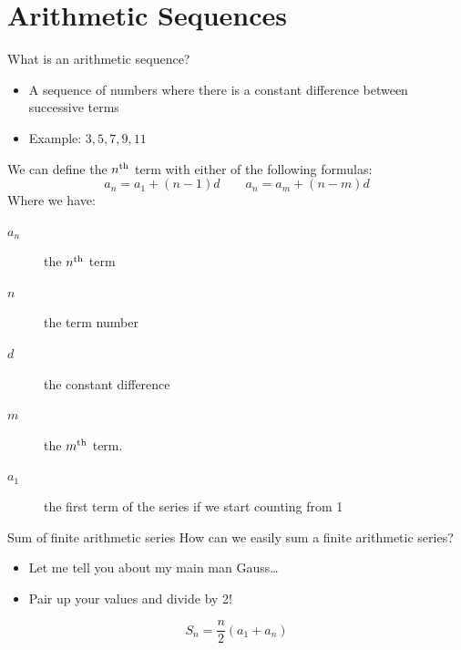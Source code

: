 	\section{Arithmetic Sequences}
	\begin{namedframe}{What is an arithmetic sequence?}
		\begin{itemize}
			\item A sequence of numbers where there is a constant difference between successive terms
			\item Example: $3,5,7,9,11$
		\end{itemize}
		\pause
		We can define the $n\textsuperscript{th}$ term with either of the following formulas:
		\[a_n = a_1 + (n-1)d \qquad a_n = a_m + (n-m)d\]
		Where we have:
		\begin{description}
			\item[$a_n$] the $n\textsuperscript{th}$ term
			\item[$n$] the term number
			\item[$d$] the constant difference
			\item[$m$] the $m\textsuperscript{th}$ term.
			\item[$a_1$] the first term of the series if we start counting from 1
		\end{description}
	\end{namedframe}
	\begin{namedframe}{Sum of finite arithmetic series}
		How can we easily sum a finite arithmetic series?
		\begin{itemize}[<+(1)->]
			\item Let me tell you about my main man Gauss\dots
			\item Pair up your values and divide by 2!
		\end{itemize}
		\pause
		\[S_n = \frac{n}{2}(a_1 + a_n)\]
	\end{namedframe}
